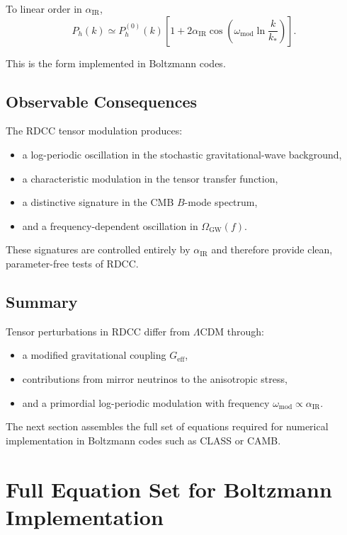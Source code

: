 \documentclass[11pt,a4paper]{article}
\begin{document}
To linear order in $\alpha_{\mathrm{IR}}$,
\begin{equation}
    P_{h}(k)
    \simeq P_{h}^{(0)}(k)\left[1 + 2\alpha_{\mathrm{IR}}
      \cos\!\left(\omega_{\mathrm{mod}}\ln\frac{k}{k_{\ast}}\right)\right].
\end{equation}

This is the form implemented in Boltzmann codes.

\subsection{Observable Consequences}

The RDCC tensor modulation produces:
\begin{itemize}
    \item a log-periodic oscillation in the stochastic gravitational-wave background,
    \item a characteristic modulation in the tensor transfer function,
    \item a distinctive signature in the CMB $B$-mode spectrum,
    \item and a frequency-dependent oscillation in $\Omega_{\mathrm{GW}}(f)$.
\end{itemize}

These signatures are controlled entirely by $\alpha_{\mathrm{IR}}$ and therefore provide clean,
parameter-free tests of RDCC.

\subsection{Summary}

Tensor perturbations in RDCC differ from $\Lambda$CDM through:
\begin{itemize}
    \item a modified gravitational coupling $G_{\mathrm{eff}}$,
    \item contributions from mirror neutrinos to the anisotropic stress,
    \item and a primordial log-periodic modulation with frequency
    $\omega_{\mathrm{mod}} \propto \alpha_{\mathrm{IR}}$.
\end{itemize}

The next section assembles the full set of equations required for numerical implementation
in Boltzmann codes such as CLASS or CAMB.

\section{Full Equation Set for Boltzmann Implementation}
\end{document}
